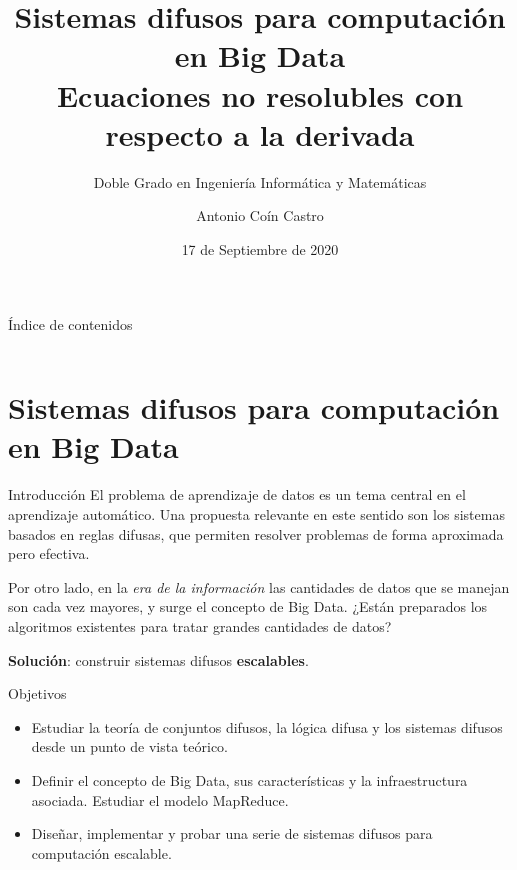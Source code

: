 \documentclass[spanish]{beamer}
\title{Sistemas difusos para computación en Big Data \\ Ecuaciones no resolubles con respecto a la derivada}
\subtitle{Doble Grado en Ingeniería Informática y Matemáticas}
\date{17 de Septiembre de 2020}
\author{Antonio Coín Castro}
\institute{Trabajo Fin de Grado \\\\\\ \textit{E.T.S de Ingenierías Informática y de Telecomunicación \\ Facultad de Ciencias}}
\begin{document}
\maketitle

\begin{frame}{Índice de contenidos}
  \begin{columns}[t]
    \begin{column}{.5\textwidth}
      \tableofcontents[sections={1}]
    \end{column}
    \begin{column}{.5\textwidth}
      \tableofcontents[sections={2}]
    \end{column}
  \end{columns}
\end{frame}

\section{Sistemas difusos para computación en Big Data}

\begin{frame}{Introducción}
  El problema de aprendizaje de datos es un tema central en el aprendizaje automático. Una propuesta relevante en este sentido son los sistemas basados en reglas difusas, que permiten resolver problemas de forma aproximada pero efectiva.

  Por otro lado, en la \textit{era de la información} las cantidades de datos que se manejan son cada vez mayores, y surge el concepto de Big Data. ¿Están preparados los algoritmos existentes para tratar grandes cantidades de datos?
  \vspace{1em}

  {\color{Maroon}\textbf{Solución}:} construir sistemas difusos \textbf{escalables}.
\end{frame}

\begin{frame}{Objetivos}
\begin{itemize}[<+->]
\item Estudiar la teoría de conjuntos difusos, la lógica difusa y los sistemas difusos desde un punto de vista teórico.
\item Definir el concepto de Big Data, sus características y la infraestructura asociada. Estudiar el modelo MapReduce.
\item Diseñar, implementar y probar una serie de sistemas difusos para computación escalable.
\end{itemize}
\end{frame}
\end{document}
